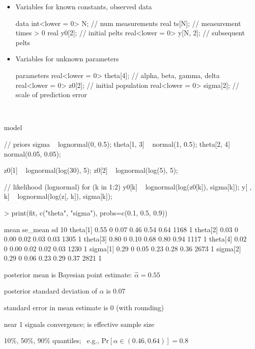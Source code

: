 \documentclass[10pt]{report}
\begin{document}
\begin{itemize}
\item Variables for known constants, observed data
{\footnotesize
\begin{stancode}
data {
  int<lower = 0> N;         // num measurements
  real ts[N];               // measurement times > 0
  real y0[2];               // initial pelts
  real<lower = 0> y[N, 2];  // subsequent pelts
}
\end{stancode}
}
\item Variables for unknown parameters
{\footnotesize
\begin{stancode}
parameters {
  real<lower = 0> theta[4];  // alpha, beta, gamma, delta
  real<lower = 0> z0[2];     // initial population
  real<lower = 0> sigma[2];  // scale of prediction error
}
\end{stancode}
}
\end{itemize}

%
\\
\spc
\begin{stancode}
model {
  // priors
  sigma ~ lognormal(0, 0.5);
  theta[{1, 3}] ~ normal(1, 0.5);
  theta[{2, 4}] ~ normal(0.05, 0.05);

  z0[1] ~ lognormal(log(30), 5);
  z0[2] ~ lognormal(log(5), 5);

  // likelihood (lognormal)
  for (k in 1:2) {
    y0[k] ~ lognormal(log(z0[k]), sigma[k]);
    y[ , k] ~ lognormal(log(z[, k]), sigma[k]);
  }
}
\end{stancode}

%
\vspace*{-12pt}
%
\begin{stancode}
> print(fit, c("theta", "sigma"), probs=c(0.1, 0.5, 0.9))
\end{stancode}
\vspace*{-8pt}
\begin{stancode}
         mean se_mean   sd  10%
theta[1] 0.55       0 0.07 0.46 0.54 0.64  1168    1
theta[2] 0.03       0 0.00 0.02 0.03 0.03  1305    1
theta[3] 0.80       0 0.10 0.68 0.80 0.94  1117    1
theta[4] 0.02       0 0.00 0.02 0.02 0.03  1230    1
sigma[1] 0.29       0 0.05 0.23 0.28 0.36  2673    1
sigma[2] 0.29       0 0.06 0.23 0.29 0.37  2821    1
\end{stancode}
\vfill
{\small
\begin{subitemize}
\item posterior mean is Bayesian point estimate: $\hat{\alpha} = 0.55$
\item posterior standard deviation of $\alpha$ is 0.07
\item standard error in mean estimate is 0 (with rounding)
\item {} near 1 signals convergence;
  is effective sample size
\item 10\%, 50\%, 90\% quantiles; \ e.g., $\mbox{Pr}[\alpha \in (0.46, 0.64)] = 0.8$
\end{subitemize}
}
\end{document}
